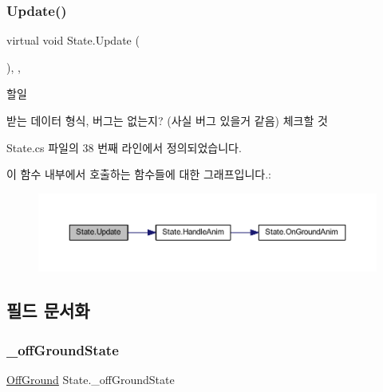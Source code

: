 \subsubsection{\texorpdfstring{Update()}{Update()}}
{\footnotesize\ttfamily virtual void State.\+Update (\begin{DoxyParamCaption}{ }\end{DoxyParamCaption})\hspace{0.3cm}{\ttfamily [inline]}, {\ttfamily [virtual]}, {\ttfamily [inherited]}}

\begin{DoxyRefDesc}{할일}
\item[\mbox{\hyperlink{todo__todo000001}{할일}}]받는 데이터 형식, 버그는 없는지? (사실 버그 있을거 같음) 체크할 것 \end{DoxyRefDesc}


State.\+cs 파일의 38 번째 라인에서 정의되었습니다.


\begin{DoxyCode}{0}

\end{DoxyCode}
이 함수 내부에서 호출하는 함수들에 대한 그래프입니다.\+:
\nopagebreak
\begin{figure}[H]
\begin{center}
\leavevmode
\includegraphics[width=350pt]{d0/d8b/class_state_ad3ecac701a93b8ef7e5365e0fc599243_cgraph}
\end{center}
\end{figure}


\subsection{필드 문서화}
\mbox{\label{class_state_ad421039bfc35b46969f174c9617ab786}} 
\subsubsection{\texorpdfstring{\_offGroundState}{\_offGroundState}}
{\footnotesize\ttfamily \mbox{\hyperlink{class_state_a7d945e793324c017a973205564cf1a56}{Off\+Ground}} State.\+\_\+off\+Ground\+State\hspace{0.3cm}{\ttfamily [inherited]}}



